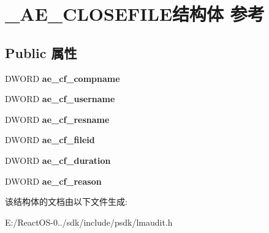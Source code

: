 \hypertarget{struct___a_e___c_l_o_s_e_f_i_l_e}{}\section{\+\_\+\+A\+E\+\_\+\+C\+L\+O\+S\+E\+F\+I\+L\+E结构体 参考}
\label{struct___a_e___c_l_o_s_e_f_i_l_e}
\subsection*{Public 属性}
\begin{DoxyCompactItemize}
\item 
\mbox{\label{struct___a_e___c_l_o_s_e_f_i_l_e_a7e3c61e242d3206889e9529967e1c285}} 
D\+W\+O\+RD {\bfseries ae\+\_\+cf\+\_\+compname}
\item 
\mbox{\label{struct___a_e___c_l_o_s_e_f_i_l_e_ac42d75b6291e8a5f5b84e255db6935a3}} 
D\+W\+O\+RD {\bfseries ae\+\_\+cf\+\_\+username}
\item 
\mbox{\label{struct___a_e___c_l_o_s_e_f_i_l_e_a0b98bf57740d9c3a01a5938f202085f6}} 
D\+W\+O\+RD {\bfseries ae\+\_\+cf\+\_\+resname}
\item 
\mbox{\label{struct___a_e___c_l_o_s_e_f_i_l_e_a84c3003b6b7059a3a423e727c896dc44}} 
D\+W\+O\+RD {\bfseries ae\+\_\+cf\+\_\+fileid}
\item 
\mbox{\label{struct___a_e___c_l_o_s_e_f_i_l_e_a074e303bd515b9aaf851cc88fe374d74}} 
D\+W\+O\+RD {\bfseries ae\+\_\+cf\+\_\+duration}
\item 
\mbox{\label{struct___a_e___c_l_o_s_e_f_i_l_e_a11b56b792347bd9b076c0d3e52c4ff43}} 
D\+W\+O\+RD {\bfseries ae\+\_\+cf\+\_\+reason}
\end{DoxyCompactItemize}


该结构体的文档由以下文件生成\+:\begin{DoxyCompactItemize}
\item 
E\+:/\+React\+O\+S-\/0../sdk/include/psdk/lmaudit.\+h\end{DoxyCompactItemize}
